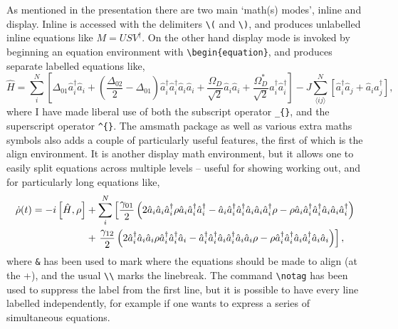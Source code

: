 \documentclass[a4paper,11pt,twoside]{article}		%
\begin{document}
As mentioned in the presentation there are two main `math(s) modes', inline and display. Inline is accessed with the delimiters \verb:\(: and \verb:\):, and produces unlabelled inline equations like \(M = USV^{\dagger}\). On the other hand display mode is invoked by beginning an equation environment with \verb:\begin{equation}:, and produces separate labelled equations like,
\begin{equation}
\hat{H} = \sum_{i}^{N} \left[ \Delta_{01}\hat{a}_{i}^{\dagger}\hat{a}_{i} + \left(\frac{\Delta_{02}}{2} - \Delta_{01}\right)\hat{a}_{i}^{\dagger}\hat{a}_{i}^{\dagger}\hat{a}_{i}\hat{a}_{i} + \frac{\Omega_{D}}{\sqrt{2}}\hat{a}_{i}\hat{a}_{i} + \frac{\Omega_{D}^{*}}{\sqrt{2}}\hat{a}_{i}^{\dagger}\hat{a}_{i}^{\dagger} \right] - J\sum_{\langle ij \rangle}^{N} \left[ \hat{a}_{i}^{\dagger}\hat{a}_{j} + \hat{a}_{i}\hat{a}_{j}^{\dagger}\right],
\label{eq:1}
\end{equation}
where I have made liberal use of both the subscript operator \verb:_{}:, and the superscript operator \verb:^{}:. The amsmath package as well as various extra maths symbols also adds a couple of particularly useful features, the first of which is the align environment. It is another display math environment, but it allows one to easily split equations across multiple levels -- useful for showing working out, and for particularly long equations like,
\begin{align}
\dot{\rho}(t) = -i\left[ \hat{H}, \rho \right] &+ \sum_{i}^{N} \left[ \frac{\gamma_{01}}{2}\left(2\hat{a}_{i}\hat{a}_{i}\hat{a}_{i}^{\dagger} \rho \hat{a}_{i}\hat{a}_{i}^{\dagger}\hat{a}_{i}^{\dagger} - \hat{a}_{i}\hat{a}_{i}^{\dagger}\hat{a}_{i}^{\dagger} \hat{a}_{i}\hat{a}_{i}\hat{a}_{i}^{\dagger} \rho - \rho \hat{a}_{i}\hat{a}_{i}^{\dagger}\hat{a}_{i}^{\dagger} \hat{a}_{i}\hat{a}_{i}\hat{a}_{i}^{\dagger}\right) \right. \notag \\
&+ \left. \frac{\gamma_{12}}{2} \left(2 \hat{a}_{i}^{\dagger}\hat{a}_{i}\hat{a}_{i} \rho \hat{a}_{i}^{\dagger}\hat{a}_{i}^{\dagger}\hat{a}_{i} - \hat{a}_{i}^{\dagger}\hat{a}_{i}^{\dagger}\hat{a}_{i} \hat{a}_{i}^{\dagger}\hat{a}_{i}\hat{a}_{i} \rho - \rho \hat{a}_{i}^{\dagger}\hat{a}_{i}^{\dagger}\hat{a}_{i} \hat{a}_{i}^{\dagger}\hat{a}_{i}\hat{a}_{i} \right) \right],
\label{eq:2}
\end{align}
where \verb:&: has been used to mark where the equations should be made to align (at the +), and the usual \verb:\\: marks the linebreak. The command \verb:\notag: has been used to suppress the label from the first line, but it is possible to have every line labelled independently, for example if one wants to express a series of simultaneous equations.
\end{document}
